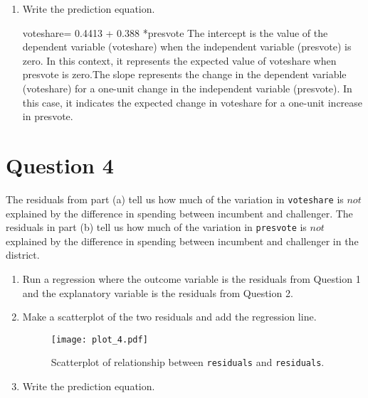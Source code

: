 \documentclass[12pt,letterpaper]{article}
\begin{document}
\begin{enumerate}
		\item Write the prediction equation.\\
		
		
		\vspace{.15cm}
		 
		\vspace{.15cm}
		\noindent voteshare= 0.4413 + 0.388 *presvote
		\noindent The intercept is the value of the dependent variable (voteshare) when the independent variable (presvote) is zero. In this context, it represents the expected value of voteshare when presvote is zero.The slope represents the change in the dependent variable (voteshare) for a one-unit change in the independent variable (presvote). In this case, it indicates the expected change in voteshare for a one-unit increase in presvote.
	\end{enumerate}
	

\vspace{.5cm}
\section*{Question 4}
\noindent The residuals from part (a) tell us how much of the variation in \texttt{voteshare} is $not$ explained by the difference in spending between incumbent and challenger. The residuals in part (b) tell us how much of the variation in \texttt{presvote} is $not$ explained by the difference in spending between incumbent and challenger in the district.
	\begin{enumerate}
		\item Run a regression where the outcome variable is the residuals from Question 1 and the explanatory variable is the residuals from Question 2.	
		
		\vspace{.15cm}
		 
		\vspace{.15cm}
		
		\item Make a scatterplot of the two residuals and add the regression line. 	
		\vspace{.15cm}
		 
		\vspace{.15cm}
		\begin{figure}[h!]\centering
			
			\caption{\footnotesize Scatterplot of relationship between \texttt{residuals} and \texttt{residuals}.}
			\label{fig:plot_4}
			\texttt{[image: plot\_4.pdf]}
		\end{figure}
		\item Write the prediction equation.
		
		\vspace{.15cm}
		 
		\vspace{.15cm}
		
	\end{enumerate}
	
\end{document}
